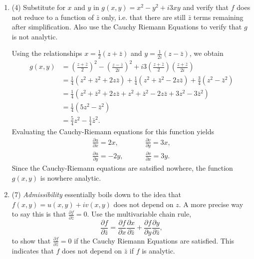\documentclass[11pt]{article}
\begin{document}
\begin{enumerate}
\begin{enumerate}
\begin{enumerate}
    
  \item (4) Substitute for $x$ and $y$ in $g(x,y) = x^2 - y^2 + i 3 x y$ and verify that $f$ does not reduce to a function of $\bar{z}$ only, i.e. that there are still $\bar{z}$ terms remaining after simplification. Also use the Cauchy Riemann Equations to verify that $g$ is not analytic.

  \begin{mdframed}
  Using the relationships $x = \frac{1}{2}(z + \bar{z})$ and $y = \frac{1}{2i}(z - \bar{z})$, we obtain
  \begin{align*}
    g(x,y) &= \left(\frac{z + \bar{z}}{2}\right)^2 - \left(\frac{z - \bar{z}}{2i}\right)^2 + i3\left(\frac{z + \bar{z}}{2}\right)\left(\frac{z + \bar{z}}{2i}\right) \\
    &= \frac{1}{4}(z^2 + \bar{z}^2 + 2 z \bar{z}) + \frac{1}{4}(z^2 + \bar{z}^2 - 2 z \bar{z}) + \frac{3}{4}(z^2 - \bar{z}^2) \\
    &= \frac{1}{4}(z^2 + \bar{z}^2 + 2 z \bar{z} + z^2 + \bar{z}^2 - 2 z \bar{z} + 3z^2 - 3\bar{z}^2) \\
    &= \frac{1}{4}(5z^2 - \bar{z}^2) \\
    &= \frac{5}{4}z^2 - \frac{1}{4}\bar{z}^2.
  \end{align*}
  Evaluating the Cauchy-Riemann equations for this function yields
  \begin{align*}
    \frac{\partial u}{\partial x} = 2x, \quad&\qquad \frac{\partial v}{\partial y} = 3x, \\
    \frac{\partial u}{\partial y} = -2y, \;&\qquad \frac{\partial v}{\partial x} = 3y.
  \end{align*}
  Since the Cauchy-Riemann equations are satsified nowhere, the function $g(x,y)$ is nowhere analytic.
  \end{mdframed}

  \item (7) {\it Admissibility} essentially boils down to the idea that $f(x,y) = u(x, y) + iv(x, y)$ does not depend on $z$. A more precise way to say this is that $\frac{\partial f}{\partial \bar{z}} = 0$. Use the multivariable chain rule,
  \begin{equation*}
    \frac{\partial f}{\partial \bar{z}} = \frac{\partial f}{\partial x} \frac{\partial x}{\partial \bar{z}} + \frac{\partial f}{\partial y} \frac{\partial y}{\partial \bar{z}},
  \end{equation*}
  to show that $\frac{\partial f}{\partial \bar{z}} = 0$ if the Cauchy Riemann Equations are satisfied. This indicates that $f$ does not depend on $\bar{z}$ if $f$ is analytic.


\end{enumerate}
\end{enumerate}
\end{enumerate}
\end{document}
